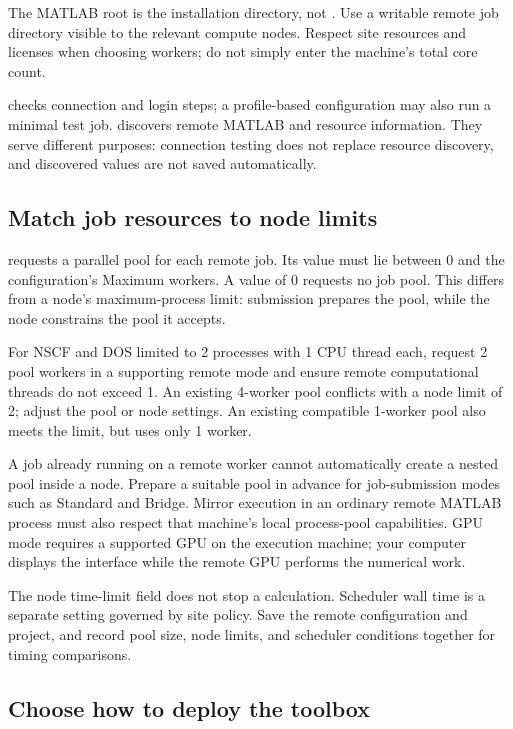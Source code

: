 The MATLAB\regmark{} root is the installation directory, not . Use a writable remote job directory visible to the relevant compute nodes. Respect site resources and licenses when choosing workers; do not simply enter the machine's total core count.

 checks connection and login steps; a profile-based configuration may also run a minimal test job.  discovers remote MATLAB\regmark{} and resource information. They serve different purposes: connection testing does not replace resource discovery, and discovered values are not saved automatically.

\subsection{Match job resources to node limits}

 requests a parallel pool for each remote job. Its value must lie between 0 and the configuration's Maximum workers. A value of 0 requests no job pool. This differs from a node's maximum-process limit: submission prepares the pool, while the node constrains the pool it accepts.

For NSCF and DOS limited to 2 processes with 1 CPU thread each, request 2 pool workers in a supporting remote mode and ensure remote computational threads do not exceed 1. An existing 4-worker pool conflicts with a node limit of 2; adjust the pool or node settings. An existing compatible 1-worker pool also meets the limit, but uses only 1 worker.

A job already running on a remote worker cannot automatically create a nested pool inside a node. Prepare a suitable pool in advance for job-submission modes such as Standard and Bridge. Mirror execution in an ordinary remote MATLAB\regmark{} process must also respect that machine's local process-pool capabilities. GPU mode requires a supported GPU on the execution machine; your computer displays the interface while the remote GPU performs the numerical work.

The node time-limit field does not stop a calculation. Scheduler wall time is a separate setting governed by site policy. Save the remote configuration and project, and record pool size, node limits, and scheduler conditions together for timing comparisons.

\subsection{Choose how to deploy the toolbox}

